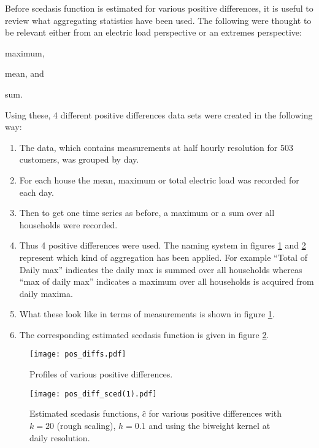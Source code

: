 Before scedasis function is estimated for various positive differences, it is useful to review what aggregating statistics have been used. The following were thought to be relevant either from an electric load perspective or an extremes perspective: \begin{enumerate*}[label=\roman*)] \item maximum, \item mean, and \item sum. \end{enumerate*} Using these, 4 different positive differences data sets were created in the following way:
\begin{enumerate}
\item The data, which contains measurements at half hourly resolution for 503 customers, was grouped by day.
\item For each house the mean, maximum or total electric load was recorded for each day.
\item Then to get one time series as before, a maximum or a sum over all households were recorded.
\item Thus 4 positive differences were used. The naming system in figures \ref{fig:pos_diff} and \ref{fig:pos_diff_sced} represent which kind of aggregation has been applied. For example ``Total of Daily max'' indicates the  daily max is summed over all households whereas ``max of daily max'' indicates a maximum over all households is acquired from daily maxima.
\item What these look like in terms of measurements is shown in figure \ref{fig:pos_diff}.
\item The corresponding estimated scedasis function is given in figure \ref{fig:pos_diff_sced}.
\end{enumerate}

\begin{figure}
\centering
\texttt{[image: pos\_diffs.pdf]}
\caption{\label{fig:pos_diff} Profiles of various positive differences.}
\end{figure}

\begin{figure}
\centering
\texttt{[image: pos\_diff\_sced(1).pdf]}
\caption{\label{fig:pos_diff_sced} Estimated scedasis functions, $\hat{c}$ for various positive differences with $k=20$ (rough scaling), $h=0.1$ and using the biweight kernel at daily resolution.}
\end{figure}


